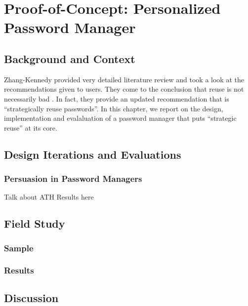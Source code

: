 \chapter[Proof-of-Concept: Personalized Password Manager]{Proof-of-Concept: Personalized Password Manager}\label{chap:pwrm}

\section{Background and Context}

Zhang-Kennedy \etal provided very detailed literature review and took a look at the recommendations given to users. They come to the conclusion that reuse is not necessarily bad \cite[p.8-9]{ZhangKennedy2016RevisitingPasswordRules}. In fact, they provide an updated recommendation that is ``strategically reuse passwords''. In this chapter, we report on the design, implementation and evalaluation of a password manager that puts ``strategic reuse'' at its core. 



\section{Design Iterations and Evaluations}

\subsection{Persuasion in Password Managers}
Talk about ATH Results here


\section{Field Study}
\subsection{Sample}
\subsection{Results}

\section{Discussion}

